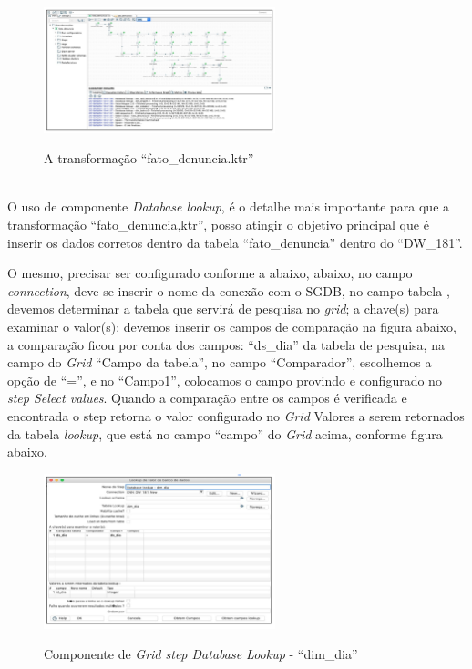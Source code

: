 \begin{figure}[H]
	\vspace*{0,2cm}
    \centering
    \caption{A transforma\c{c}\~{a}o ``fato\_denuncia.ktr''}
    \includegraphics[width=0.6\textwidth]{./04-figuras/figura-fato}
    \label{fig:ilustfigfato}
\end{figure}
\vspace*{-0,9cm}
{\raggedright {}} \\

O uso de componente \textit{Database lookup}, \'{e} o detalhe mais importante para que a transforma\c{c}\~{a}o ``fato\_denuncia,ktr'', posso atingir o objetivo principal que \'{e} inserir os dados corretos dentro da tabela ``fato\_denuncia'' dentro do ``DW\_181''. 

O mesmo, precisar ser configurado conforme a abaixo, abaixo, no campo \textit{connection}, deve-se inserir o nome da conex\~{a}o com o SGDB, no campo tabela , devemos determinar a tabela que servir\'{a} de pesquisa no \textit{grid}; a chave(s) para examinar o valor(s): devemos inserir os campos de compara\c{c}\~{a}o na figura abaixo, a compara\c{c}\~{a}o ficou por conta dos campos: ``ds\_dia''  da tabela de pesquisa, na campo do \textit{Grid} ``Campo da tabela'', no campo ``Comparador'', escolhemos a op\c{c}\~{a}o de ``='', e no ``Campo1'', colocamos o campo provindo e configurado no \textit{step Select values}. Quando a compara\c{c}\~{a}o entre os campos \'{e} verificada e encontrada o step retorna o valor configurado no \textit{Grid} Valores a serem retornados da tabela \textit{lookup}, que est\'{a} no campo 
``campo'' do \textit{Grid} acima, conforme figura abaixo.

\begin{figure}[H]
	\vspace*{0,2cm}
    \centering
    \caption{Componente de \textit{Grid step Database Lookup} - ``dim\_dia''}
    \includegraphics[width=0.6\textwidth]{./04-figuras/figura-dl-dim-dia}
    \label{fig:ilustfigdldimdia}
\end{figure}
\vspace*{-0,9cm}
{\raggedright {}} \\

